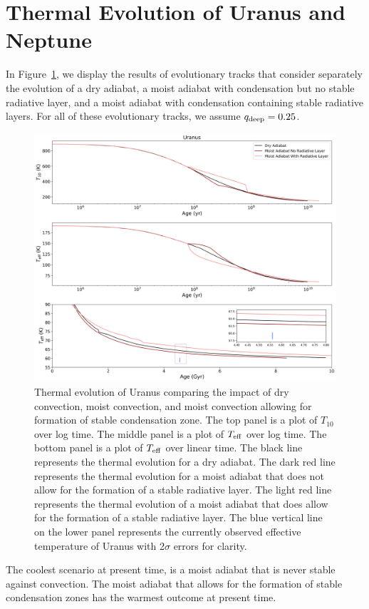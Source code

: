 \documentclass[11pt]{ucscthesisbs}
\begin{document}
\section{Thermal Evolution of Uranus and Neptune}

In Figure~\ref{fig:evolve_adiabats}, we display the results of evolutionary tracks that consider separately the evolution of a dry adiabat, a moist adiabat with condensation but no stable radiative layer, and a moist adiabat with condensation containing stable radiative layers. For all of these evolutionary tracks, we assume $q_{\rm deep} = 0.25$. 
\begin{figure}[h]
 \centerline{
  \includegraphics[width=\columnwidth]{figures/dry_moist_radiative_u_cooling_curves_adiabat_comparisons.png}
 }
\caption[Thermal Evolution Curves for Uranus - Adiabat Comparisons]
{Thermal evolution of Uranus comparing the impact of dry convection, moist convection, and moist convection allowing for formation of stable condensation zone. The top panel is a plot of $T_{10}$ over log time. The middle panel is a plot of $T_{\rm eff}$ over log time. The bottom panel is a plot of $T_{\rm eff}$ over linear time. The black line represents the thermal evolution for a dry adiabat. The dark red line represents the thermal evolution for a moist adiabat that does not allow for the formation of a stable radiative layer. The light red line represents the thermal evolution of a moist adiabat that does allow for the formation of a stable radiative layer. The blue vertical line on the lower panel represents the currently observed effective temperature of Uranus with 2$\sigma$ errors for clarity. }
\label{fig:evolve_adiabats}
\end{figure}
The coolest scenario at present time, is a moist adiabat that is never stable against convection. The moist adiabat that allows for the formation of stable condensation zones has the warmest outcome at present time. 
\end{document}
